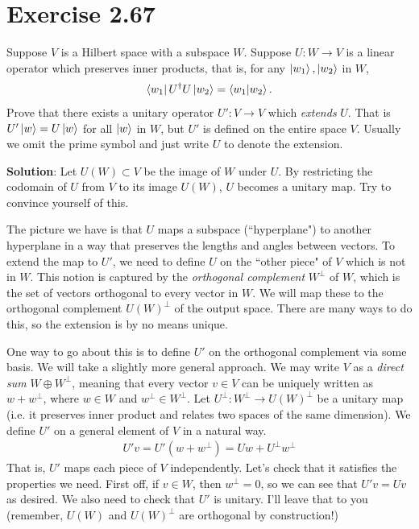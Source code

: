 \documentclass{book}
\begin{document}
\section*{Exercise 2.67}
    Suppose $V$ is a Hilbert space with a subspace $W$. Suppose $U: W \to V$ is a linear operator which preserves inner products, that is, for any $\ket{w_1}, \ket{w_2}$ in $W$,
    \begin{align}
        \bra{w_1}U^\dagger U \ket{w_2} = \braket{w_1}{w_2}.
    \end{align}
    Prove that there exists a unitary operator $U': V\to V$ which \emph{extends} $U$. That is $U'\ket{w} = U\ket{w}$ for all $\ket{w}$ in $W$, but $U'$ is defined on the entire space $V$. Usually we omit the prime symbol and just write $U$ to denote the extension.

    \textbf{Solution}: Let $U(W) \subset V$ be the image of $W$ under $U$. By restricting the codomain of $U$ from $V$ to its image $U(W)$, $U$ becomes a unitary map. Try to convince yourself of this. 

    The picture we have is that $U$ maps a subspace (``hyperplane") to another hyperplane in a way that preserves the lengths and angles between vectors. To extend the map to $U'$, we need to define $U$ on the ``other piece" of $V$ which is not in $W$. This notion is captured by the \emph{orthogonal complement} $W^\perp$ of $W$, which is the set of vectors orthogonal to every vector in $W$. We will map these to the orthogonal complement $U(W)^\perp$ of the output space. There are many ways to do this, so the extension is by no means unique.

    One way to go about this is to define $U'$ on the orthogonal complement via some basis. We will take a slightly more general approach. We may write $V$ as a \emph{direct sum} $W\oplus W^\perp$, meaning that every vector $v \in V$ can be uniquely written as $w + w^\perp$, where $w\in W$ and $w^\perp \in W^\perp$. Let $U^\perp: W^\perp \to U(W)^\perp$ be a unitary map (i.e. it preserves inner product and relates two spaces of the same dimension). We define $U'$ on a general element of $V$ in a natural way.
    \begin{align}
        U'v = U'(w + w^\perp) = Uw + U^\perp w^\perp
    \end{align}
    That is, $U'$ maps each piece of $V$ independently. Let's check that it satisfies the properties we need. First off, if $v \in W$, then $w^\perp = 0$, so we can see that $U' v  = U v$ as desired. We also need to check that $U'$ is unitary. I'll leave that to you (remember, $U(W)$ and $U(W)^\perp$ are orthogonal by construction!)
\end{document}
